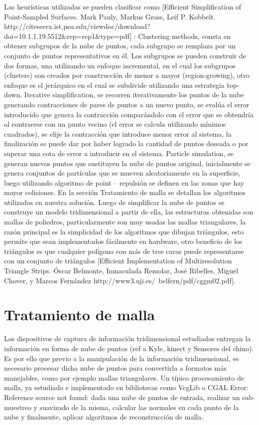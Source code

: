 Las heurísticas utilizadas se pueden clasificar como
[Efficient Simplification of Point-Sampled Surfaces. Mark Pauly, Markus Gross, Leif P. Kobbelt.
http://citeseerx.ist.psu.edu/viewdoc/download?doi=10.1.1.19.5512&rep=rep1&type=pdf] :
   Clustering methods, consta en obtener subgrupos de la nube de puntos, cada subgrupo se remplaza por un conjunto de puntos representativos en él. Los subgrupos se pueden construir de dos formas, una utilizando un enfoque incremental, en el cual los subgrupos (clusters) son creados por construcción de menor a mayor (region-growing), otro enfoque es el jerárquico en el cual se subdivide utilizando una estrategia top-down.
   Iterative simplification, se recorren iterativamente los puntos de la nube generando contracciones de pares de puntos a un nuevo punto, se evalúa el error introducido que genera la contracción comparándolo con el error que se obtendría al contraerse con un punto vecino (el error se calcula utilizando mínimos cuadrados), se elije la contracción que introduce menor error al sistema, la finalización se puede dar por haber logrado la cantidad de puntos deseada o por superar una cota de error a introducir en el sistema.
   Particle simulation, se generan nuevos puntos que sustituyen la nube de puntos original, inicialmente se genera conjuntos de partículas que se mueven aleatoriamente en la superficie, luego utilizando algoritmo de point – repulsión se definen en las zonas que hay mayor colisiones.
En la sección Tratamiento de malla se detallan los algoritmos utilizados en nuestra solución.
Luego de simplificar la nube de puntos se construye un modelo tridimensional a partir de ella, las estructuras obtenidas son mallas de poliedros, particularmente son muy usadas las mallas triangulares, la razón principal es la simplicidad de los algoritmos que dibujan triángulos, esto permite que sean implementados fácilmente en hardware, otro beneficio de los triángulos es que cualquier polígono con más de tres caras puede representarse con un conjunto de triángulos [Efficient Implementation of Multiresolution Triangle Strips. Óscar Belmonte, Inmaculada Remolar, José Ribelles, Miguel Chover, y Marcos Fernández   http://www3.uji.es/~belfern/pdf/cggm02.pdf].

\section{Tratamiento de malla}

Los dispositivos de captura de información tridimensional estudiados entregan la información en forma de nube de puntos (ref a Kyle, kinect  y Sensores del chino). Es por ello que previo a la manipulación de la información tridimensional, es necesario procesar dicha nube de puntos para convertirla a formatos más manejables, como por ejemplo mallas triangulares.
Un típico procesamiento de malla, ya estudiado e implementado en bibliotecas como VcgLib o CGAL Error: Reference source not found: dada una nube de puntos de entrada, realizar un sub-muestreo y suavizado de la misma, calcular las normales en cada punto de la nube y finalmente, aplicar algoritmos de reconstrucción de malla.

